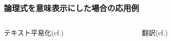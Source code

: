 \documentclass[dvipdfmx]{beamer}
\begin{document}
\begin{frame}
\frametitle{論理式を意味表示にした場合の応用例}

\begin{columns}[t]
    \begin{column}{0.5\textwidth} %
      \begin{center}
        テキスト平易化(cf.\cite{plain_text})\\
        \begin{figure}[h]
                \label{fig:application1}
        \end{figure}
      \end{center}
    \end{column}
    \begin{column}{0.5\textwidth} %
      \begin{center}
        翻訳(cf.\cite{neuralAMR})\\
        \begin{figure}[h]
                \label{fig:application2}
        \end{figure}
      \end{center}

    \end{column}
\end{columns}

\end{frame}



\end{document}
